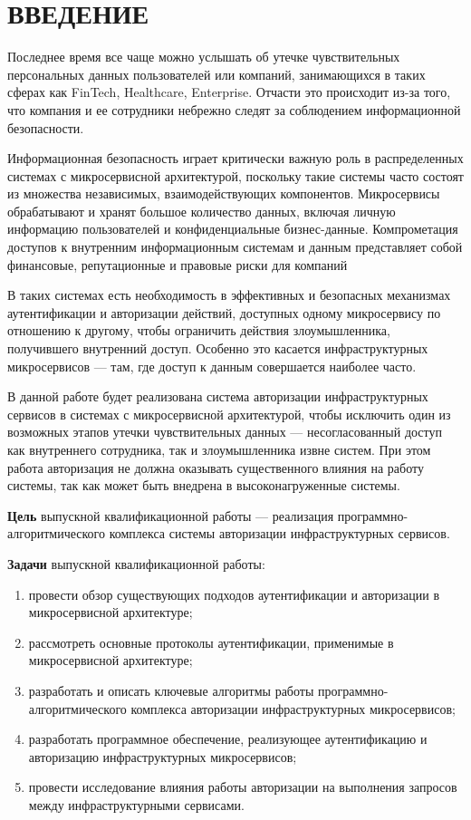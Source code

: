 {\centering \chapter*{ВВЕДЕНИЕ}}

Последнее время все чаще можно услышать об утечке чувствительных персональных данных пользователей или компаний, занимающихся в таких сферах как FinTech, Healthcare, Enterprise. Отчасти это происходит из-за того, что компания и ее сотрудники небрежно следят за соблюдением информационной безопасности.

Информационная безопасность играет критически важную роль в распределенных системах с микросервисной архитектурой, поскольку такие системы часто состоят из множества независимых, взаимодействующих компонентов. Микросервисы обрабатывают и хранят большое количество данных, включая личную информацию пользователей и конфиденциальные бизнес-данные. Компрометация доступов к внутренним информационным системам и данным представляет собой финансовые, репутационные и правовые риски для компаний

В таких системах есть необходимость в эффективных и безопасных механизмах аутентификации и авторизации действий, доступных одному микросервису по отношению к другому, чтобы ограничить действия злоумышленника, получившего внутренний доступ. Особенно это касается инфраструктурных микросервисов --- там, где доступ к данным совершается наиболее часто.

В данной работе будет реализована система авторизации инфраструктурных сервисов в системах с микросервисной архитектурой, чтобы исключить один из возможных этапов утечки чувствительных данных --- несогласованный доступ как внутреннего сотрудника, так и злоумышленника извне систем. При этом работа авторизация не должна оказывать существенного влияния на работу системы, так как может быть внедрена в высоконагруженные системы.

\textbf{Цель} выпускной квалификационной работы --- реализация программно-алгоритмического комплекса системы авторизации инфраструктурных сервисов.

\textbf{Задачи} выпускной квалификационной работы:
\begin{enumerate}
\item провести обзор существующих подходов аутентификации и авторизации в микросервисной архитектуре;
\item рассмотреть основные протоколы аутентификации, применимые в микросервисной архитектуре;
\item разработать и описать ключевые алгоритмы работы программно-алгоритмического комплекса авторизации инфраструктурных микросервисов;
\item разработать программное обеспечение, реализующее аутентификацию и авторизацию инфраструктурных микросервисов;
\item провести исследование влияния работы авторизации на выполнения запросов между инфраструктурными сервисами.
\end{enumerate}


